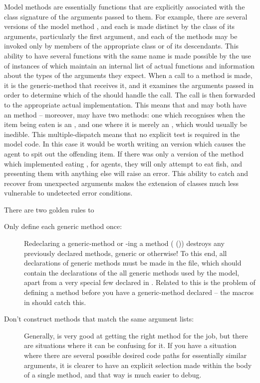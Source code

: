 Model methods are essentially functions that are explicitly associated
with the class signature of the arguments passed to them. For example,
there are several versions of the model method , and each
is made distinct by the class of its arguments, particularly the first
argument, and each of the methods may be invoked only by members of
the appropriate class or of its descendants.  This ability to have
several functions with the same name is made possible by the use of
instances of  which maintain an internal list
of actual functions and information about the types of the arguments
they expect. When a call to a method is made, it is the generic-method
that receives it, and it examines the arguments passed in order to
determine which of the  should handle the call.
The call is then forwarded to the appropriate actual implementation.
This means that and  may both have an
 method -- moreover,  may have two
 methods: one which recognises when the item being eaten
is an , and one where it is merely an ,
which would usually be inedible.  This multiple-dispatch means that no
explicit test is required in the model code.  In this case it would be
worth writing an  version which causes the agent
to spit out the offending item.  If there was only a version of
the  method which implemented eating ,
for  agents, they will only attempt to eat fish, and
presenting them with anything else will raise an error.  This ability
to catch and recover from unexpected arguments makes
the extension of classes much less vulnerable to undetected error
conditions. 

There are two golden rules to 
\begin{description}
\item[Only define each generic method once:] Redeclaring a
generic-method or -ing a method
(  ()) destroys
any previously declared  methods, generic or
otherwise! To this end, all declarations of generic methods must
be made in the  file, which
should contain the declarations of the all generic methods used by
the model, apart from a very special few declared in .
Related to this is the problem of defining a method
before you have a generic-method declared -- the macros
in  should catch this.
\item[Don't construct methods that match the same argument lists:]
Generally, \SCLOS is very good at getting the right method for the
job, but there are situations where it can be confusing for it.
If you have a situation where there are several possible desired
code paths for essentially similar arguments, it is clearer to
have an explicit selection made within the body of a single
method, and that way is much easier to debug.
\end{description}

